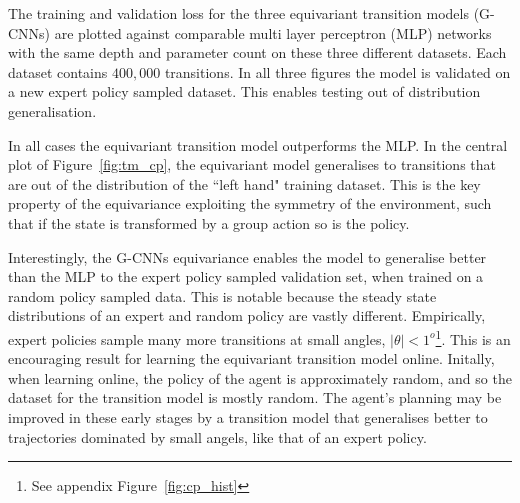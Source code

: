 \documentclass[mlabstract]{jmlr}
\begin{document}
The training and validation loss for the three equivariant transition models (G-CNNs) are plotted against comparable multi layer perceptron (MLP) networks with the same depth and parameter count on these three different datasets. Each dataset contains $400,000$ transitions. In all three figures the model is validated on a new expert policy sampled dataset. This enables testing out of distribution generalisation.

In all cases the equivariant transition model outperforms the MLP. In the central plot of Figure~\ref{fig:tm_cp}, the equivariant model generalises to transitions that are out of the distribution of the ``left hand" training dataset. This is the key property of the equivariance exploiting the symmetry of the environment, such that if the state is transformed by a group action so is the policy.

Interestingly, the G-CNNs equivariance enables the model to generalise better than the MLP to the expert policy sampled validation set, when trained on a random policy sampled data. This is notable because the steady state distributions of an expert and random policy are vastly different. Empirically, expert policies sample many more transitions at small angles, $|\theta| < 1^o$\footnote{See appendix Figure~\ref{fig:cp_hist}}. This is an encouraging result for learning the equivariant transition model online. Initally, when learning online, the policy of the agent is approximately random, and so the dataset for the transition model is mostly random. The agent's planning may be improved in these early stages by a transition model that generalises better to trajectories dominated by small angels, like that of an expert policy.
\end{document}
